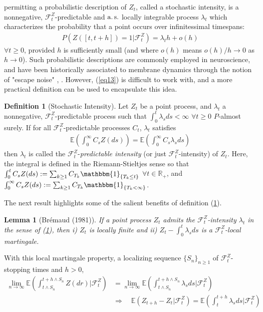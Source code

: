 \documentclass[12pt, oneside]{report}
\newcommand{\E}{\mathbb{E}}
\newcommand{\mbb}[1]{\mathbb{#1}}
\newcommand{\1}[1]{\mathbbm{1}_{\{#1\}}}
\newcommand{\mc}[1]{\mathcal{#1}}
\newtheorem{lemma}[theorem]{Lemma}
\theoremstyle{definition}
\newtheorem{definition}[theorem]{Definition}
\begin{document}
permitting a probabilistic description of $Z_t$, called a stochastic intensity,
is a nonnegative, $\mc{F}^Z_{t}$-predictable and $\operatorname{a.s.}$ locally integrable
process $\lambda_t$ which characterizes the probability that a point occurs over
infinitessimal timespans:
\begin{align}
    P(Z([t, t+h])=1|\mc{F}^Z_t)=\lambda_th+o(h)\label{eq13}
\end{align}
$\forall t\geq 0$, provided $h$ is sufficiently small (and where $o(h)$ means
$o(h)/h\rightarrow 0$ as $h\rightarrow 0$). Such probabilistic descriptions are commonly employed
in neuroscience, and have been historically associated to membrane dynamics through the notion of "escape noise" \cite{Plesser_Gerstner_2000}, \cite{Habenschuss_Jonke_Maass_2013}.
However, (\ref{eq13}) is difficult to work with, and a more practical definition can be used to encapsulate this idea.
\begin{definition}[Stochastic Intensity]\label{def9} Let $Z_t$ be a point
    process, and $\lambda_t$ a nonnegative, $\mc{F}^Z_{t}$-predictable process
    such that $\int_0^t\lambda_sds<\infty$ $\forall t\geq 0$ $P$-almost surely.
    If for all $\mc{F}^Z_t$-predictable processes $C_t$, $\lambda_t$ satisfies
    \begin{align*}
        \E\left(\int_{0}^\infty C_sZ(ds)\right)=\E\left(\int_{0}^\infty C_s\lambda_sds\right)
    \end{align*}
    then $\lambda_t$ is called the $\mc{F}^Z_t$-{\it predictable intensity} (or
    just $\mc{F}^Z_t$-intensity) of $Z_t$. Here, the integral is defined in the Riemann-Stieltjes
    sense so that $\int_0^t C_sZ(ds):=\sum_{k\geq 1}C_{T_k}\1{T_k\leq t}$ $\forall
    t\in\mbb{R}_+$, and $\int_0^\infty C_sZ(ds):=\sum_{k\geq
    1}C_{T_k}\1{T_k<\infty}$.
\end{definition}
The next result \cite[ch.2, theorem 8]{Bremaud_1981} highlights some of the salient benefits of
definition (\ref{def9}).
\begin{lemma}[Br\'emaud (1981)]\label{lem1} If a point process $Z_t$ admits the
    $\mc{F}^Z_t$-intensity $\lambda_t$ in the sense of (\ref{def9}), then i)
    $Z_t$ is locally finite and ii) $Z_t-\int_0^t\lambda_sds$ is a
    $\mc{F}^Z_t$-local martingale.
\end{lemma}
With this local martingale property, a localizing sequence $\{S_n\}_{n\geq 1}$
of $\mc{F}^Z_t$-stopping times and $h>0$,
\begin{align*}
    \lim_{n\rightarrow\infty}\E\left(\int_{t\wedge S_n}^{t+h\wedge S_n}Z(dr)\bigg|\mc{F}^Z_t\right)&=\lim_{n\rightarrow\infty}\E\left(\int_{t\wedge S_n}^{t+h\wedge S_n}\lambda_sds\bigg|\mc{F}^Z_t\right)\\
    &\Rightarrow\quad\E\left(Z_{t+h}-Z_t|\mc{F}^Z_t\right)=\E\left(\int_t^{t+h}\lambda_sds\bigg|\mc{F}^Z_t\right)
\end{align*}
\end{document}

